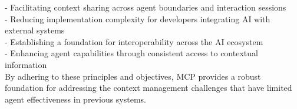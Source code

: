 - Facilitating context sharing across agent boundaries and interaction sessions\\ \newline
- Reducing implementation complexity for developers integrating AI with external systems\\ \newline
- Establishing a foundation for interoperability across the AI ecosystem\\ \newline
- Enhancing agent capabilities through consistent access to contextual information\\ \newline
By adhering to these principles and objectives, MCP provides a robust foundation for addressing the context management challenges that have limited agent effectiveness in previous systems.\\
